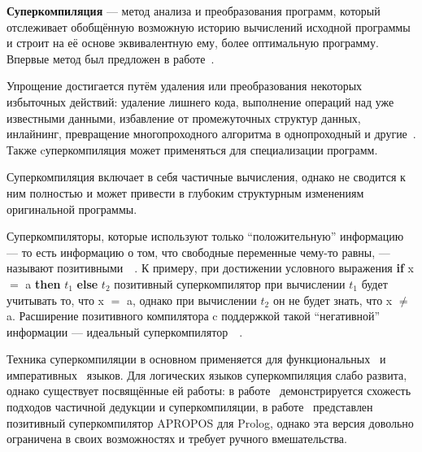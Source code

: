 {\bf Суперкомпиляция} --- метод анализа и преобразования программ,
который отслеживает обобщённую возможную историю вычислений исходной
программы и строит на её основе эквивалентную ему, более оптимальную программу.
Впервые метод был предложен в работе~\cite{turchinSC}.

Упрощение достигается путём удаления или преобразования
некоторых избыточных действий: удаление лишнего кода, выполнение
операций над уже известными данными, избавление от промежуточных
структур данных, инлайнинг, превращение многопроходного алгоритма
в однопроходный и другие~\cite{scompRevisited}.
Также cуперкомпиляция может применяться для специализации программ.


Суперкомпиляция включает в себя частичные вычисления, однако не
сводится к ним полностью и может привести в глубоким структурным
изменениям оригинальной программы.

Суперкомпиляторы, которые используют только ``положительную''
информацию --- то есть информацию о том, что свободные переменные
чему-то равны, --- называют
позитивными~~\cite{scPos}.
К примеру, при достижении условного выражения
{\bf if} x $=$ a {\bf then} $t_1$ {\bf else} $t_2$
позитивный суперкомпилятор при вычислении $t_1$ будет учитывать то,
что x $=$ a, однако при вычислении $t_2$ он не будет знать, что
x $\neq$ a.
Расширение позитивного компилятора c поддержкой такой ``негативной''
информации --- идеальный
суперкомпилятор~~\cite{scPerf}.

Техника суперкомпиляции в основном применяется для
функциональных~\cite{scHaskell, scPos} и императивных~\cite{scJava}
языков.
Для логических языков суперкомпиляция слабо развита, однако существует
посвящённые ей работы:
в работе~\cite{pdAndDriving} демонстрируется схожесть подходов частичной дедукции
и суперкомпиляции,
в работе~\cite{apropos} представлен позитивный суперкомпилятор APROPOS
для Prolog, однако эта версия довольно ограничена в своих возможностях
и требует ручного вмешательства.




